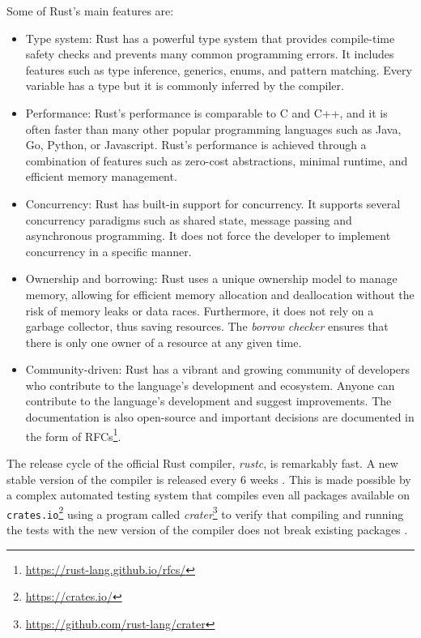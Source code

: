 Some of Rust's main features are:

\begin{itemize}
      \item Type system: Rust has a powerful type system
            that provides compile-time safety checks and prevents many common programming errors.
            It includes features such as type inference, generics, enums, and pattern matching.
            Every variable has a type but it is commonly inferred by the compiler.
      \item Performance: Rust's performance is comparable to C and C++,
            and it is often faster than many other popular programming languages
            such as Java, Go, Python, or Javascript.
            Rust's performance is achieved through a combination of features
            such as zero-cost abstractions, minimal runtime, and efficient memory management.
      \item Concurrency: Rust has built-in support for concurrency.
            It supports several concurrency paradigms such as shared state,
            message passing and asynchronous programming.
            It does not force the developer to implement concurrency in a specific manner.
      \item Ownership and borrowing: Rust uses a unique ownership model to manage memory,
            allowing for efficient memory allocation and deallocation
            without the risk of memory leaks or data races.
            Furthermore, it does not rely on a garbage collector, thus saving resources.
            The \emph{borrow checker} ensures that
            there is only one owner of a resource at any given time.
      \item Community-driven: Rust has a vibrant and growing community of developers
            who contribute to the language's development and ecosystem.
            Anyone can contribute to the language's development and suggest improvements.
            The documentation is also open-source and important decisions are documented
            in the form of \acrfull{RFCs}\footnote{\url{https://rust-lang.github.io/rfcs/}}.
\end{itemize}

The release cycle of the official Rust compiler, \textit{rustc}, is remarkably fast.
A new stable version of the compiler is released every 6 weeks \cite[Appendix G]{rust-book}.
This is made possible by a complex automated testing system that compiles even all packages
available on \texttt{crates.io}\footnote{\url{https://crates.io/}}
using a program called \textit{crater}\footnote{\url{https://github.com/rust-lang/crater}}
to verify that compiling and running the tests with the new version of the compiler
does not break existing packages \cite{albini2019}.

